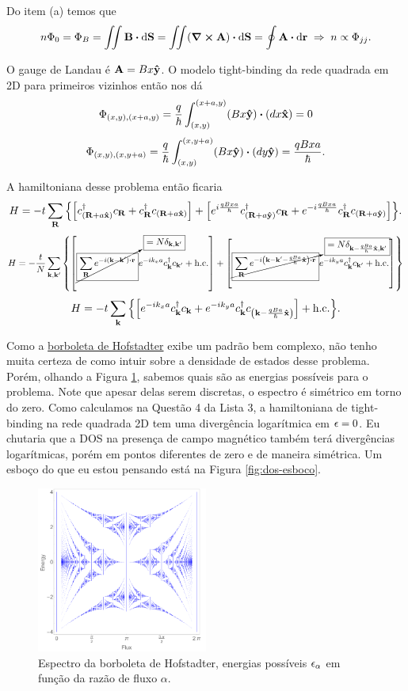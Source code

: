 \documentclass[a4paper,10pt]{article}
\begin{document}
Do item (a) temos que
$$
n \Phi_0 = \Phi_B = \iint \B \vdot \dd{\vb{S}} = \iint (\curl{\A}) \vdot \dd{\vb{S}} = \oint \A \vdot \dd{\r} \implies n \propto \Phi_{jj}.
$$

O gauge de Landau é $\vb{A} = Bx \vu{y}$. O modelo tight-binding da rede quadrada em 2D para primeiros vizinhos então nos dá
$$
\Phi_{(x,y),(x+a,y)} = \frac{q}{\hbar} \int_{(x,y)}^{(x+a,y)} (B x \vu{y}) \vdot (dx \vu{x}) = 0
$$
$$
\Phi_{(x,y),(x,y+a)} = \frac{q}{\hbar} \int_{(x,y)}^{(x,y+a)} (B x \vu{y}) \vdot (dy \vu{y}) = \frac{qBxa}{\hbar}.
$$

A hamiltoniana desse problema então ficaria
$$
H = -t \sum_{\vb{R}}
\qty{
\qty[c^\dagger_{(\vb{R}+a\vu{x})} c_{\vb{R}} + c_{\vb{R}}^\dagger c_{(\vb{R}+a\vu{x})}] +
\qty[e^{i\frac{qBxa}{\hbar}} c^\dagger_{(\vb{R}+a\vu{y})} c_{\vb{R}} + e^{-i\frac{qBxa}{\hbar}}c_{\vb{R}}^\dagger c_{(\vb{R}+a\vu{y})}]
}.
$$
$$
H = -\frac{t}{N} \sum_{\k,\k'}
\qty{
\qty[
\cancelto{\boxed{= N \delta_{\k,\k'}}}{\boxed{\sum_{\R} e^{-i(\k-\k')\vdot\r}}}
e^{-ik_x a} c_{\k}^\d c_{\k'} + \hc] +
\qty[
\cancelto{\boxed{= N \delta_{\k-\frac{qBa}{\hbar}\vu{x},\k'}}}{\boxed{\sum_{\R} e^{-i\qty(\k-\k'-\frac{qBa}{\hbar}\vu{x})\vdot\r}}}
e^{-ik_y a} c_{\k}^\d c_{\k'} + \hc]
}
$$
$$
H = -t \sum_{\vb{k}} \qty{
\qty[e^{-ik_x a} c_{\vb{k}}^\dagger c_{\vb{k}} +
e^{-ik_y a} c_{\vb{k}}^\dagger c_{\qty(\vb{k}- \frac{qBa}{\hbar} \vu{x})}
] + \text{h.c.}}.
$$

Como a \href{https://en.wikipedia.org/wiki/Hofstadter's_butterfly}{borboleta de Hofstadter} exibe um padrão bem complexo, não tenho muita certeza de como intuir sobre a densidade de estados desse problema. Porém, olhando a Figura \ref{fig:butterfly}, sabemos quais são as energias possíveis para o problema. Note que apesar delas serem discretas, o espectro é simétrico em torno do zero. Como calculamos na Questão 4 da Lista 3, a hamiltoniana de tight-binding na rede quadrada 2D tem uma divergência logarítmica em $\epsilon = 0$. Eu chutaria que a DOS na presença de campo magnético também terá divergências logarítmicas, porém em pontos diferentes de zero e de maneira simétrica. Um esboço do que eu estou pensando está na Figura \ref{fig:dos-esboco}.
\begin{figure}[H]
\centering
\includegraphics[width=0.5\textwidth]{fig/butterfly.png}
\caption{Espectro da borboleta de Hofstadter, energias possíveis $\epsilon_\alpha$ em função da razão de fluxo $\alpha$.}
\label{fig:butterfly}
\end{figure}
\end{document}
